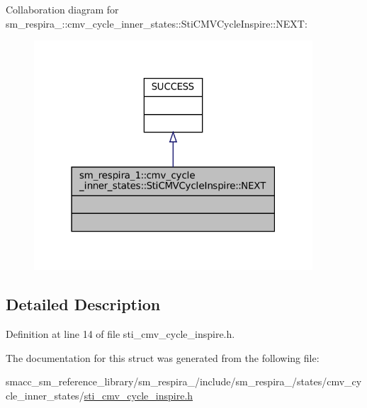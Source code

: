 Collaboration diagram for sm\+\_\+respira\+\_\+:\+:cmv\+\_\+cycle\+\_\+inner\+\_\+states\+:\+:Sti\+C\+M\+V\+Cycle\+Inspire\+:\+:N\+E\+XT\+:
\nopagebreak
\begin{figure}[H]
\begin{center}
\leavevmode
\includegraphics[width=295pt]{structsm__respira__1_1_1cmv__cycle__inner__states_1_1StiCMVCycleInspire_1_1NEXT__coll__graph}
\end{center}
\end{figure}


\subsection{Detailed Description}


Definition at line 14 of file sti\+\_\+cmv\+\_\+cycle\+\_\+inspire.\+h.



The documentation for this struct was generated from the following file\+:\begin{DoxyCompactItemize}
\item 
smacc\+\_\+sm\+\_\+reference\+\_\+library/sm\+\_\+respira\+\_/include/sm\+\_\+respira\+\_/states/cmv\+\_\+cycle\+\_\+inner\+\_\+states/\hyperlink{sti__cmv__cycle__inspire_8h}{sti\+\_\+cmv\+\_\+cycle\+\_\+inspire.\+h}\end{DoxyCompactItemize}
